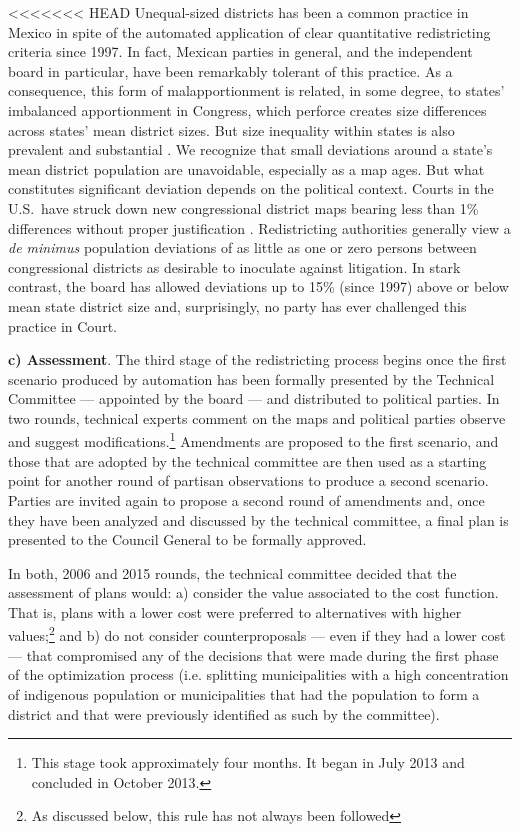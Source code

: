 \documentclass[letter,12pt]{article}
\begin{document}
<<<<<<< HEAD
Unequal-sized districts has been a common practice in Mexico in spite of the automated application of clear quantitative redistricting criteria since 1997. In fact, Mexican parties in general, and the independent board in particular, have been remarkably tolerant of this practice. As a consequence, this form of malapportionment is related, in some degree, to states' imbalanced apportionment in Congress, which perforce creates size differences across states' mean district sizes. But size inequality within states is also prevalent and substantial \citep{magar.etalBiasMultiParty2015}. We recognize that small deviations around a state's mean district population are unavoidable, especially as a map ages. But what constitutes significant deviation depends on the political context. Courts in the U.S.\ have struck down new congressional district maps bearing less than 1\% differences without proper justification \citep{tuckerApportionment.1985}. Redistricting authorities generally view a \emph{de minimus} population deviations of as little as one or zero persons between congressional districts as desirable to inoculate against litigation. In stark contrast, the board has allowed deviations up to 15\% (since 1997) above or below mean state district size \citep{lujambio.vives.2008,trelles.mtz.polygob2012} and, surprisingly, no party has ever challenged this practice in Court. 

\textbf{c) Assessment}. The third stage of the redistricting process begins once the first scenario produced by automation has been formally presented by the Technical Committee --- appointed by the board --- and distributed to political parties. In two rounds, technical experts comment on the maps and political parties observe and suggest modifications.\footnote{This stage took approximately four months. It began in July 2013 and concluded in October 2013.} Amendments are proposed to the first scenario, and those that are adopted by the technical committee are then used as a starting point for another round of partisan observations to produce a second scenario. Parties are invited again to propose a second round of amendments and, once they have been analyzed and discussed by the technical committee, a final plan is presented to the Council General to be formally approved. 

In both, 2006 and 2015 rounds, the technical committee decided that the assessment of plans would: a) consider the value associated to the cost function. That is, plans with a lower cost were preferred to alternatives with higher values;\footnote{As discussed below, this rule has not always been followed} and b) do not consider counterproposals --- even if they had a lower cost --- that compromised any of the decisions that were made during the first phase of the optimization process (i.e. splitting municipalities with a high concentration of indigenous population or municipalities that had the population to form a district and that were previously identified as such by the committee).  
\end{document}
